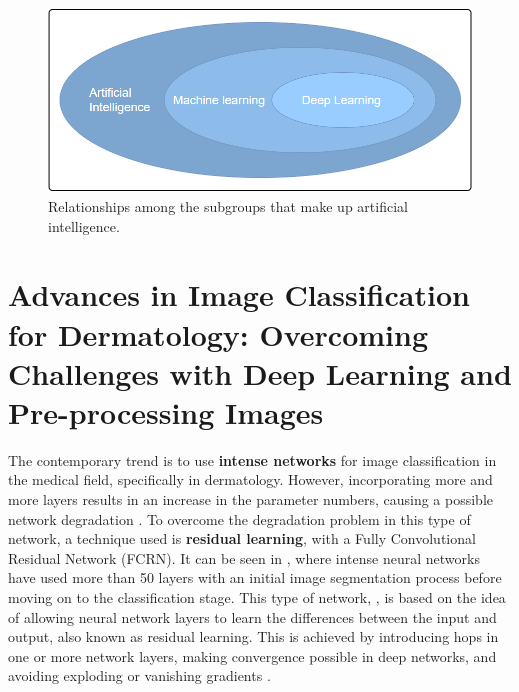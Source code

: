 \begin{figure}[ht]
    \begin{center}
        \includegraphics[scale=0.60]{images/State_of_the_art/AI_Group.png}
        \caption{Relationships among the subgroups that make up artificial intelligence.}
    \label{fig:IA Subgroup}    
    \end{center}
\end{figure}


\section{Advances in Image Classification for Dermatology: Overcoming Challenges with Deep Learning
and  Pre-processing Images}

The contemporary trend is to use  \textbf{intense networks} for image classification in the medical field, specifically in dermatology. However, incorporating more and more layers results in an increase in the parameter numbers, causing a possible network degradation \cite{roy_effects_2023}. To overcome the degradation problem in this type of network, a technique used is \textbf{residual learning}, with a Fully Convolutional 
Residual Network (FCRN). It can be seen in  \cite{7792699}, where intense neural networks have used more than 50 layers with an initial image segmentation process before moving on to the classification stage.  This type of network, \cite{laina_deeper_2016}, is based on the idea of allowing neural network layers to learn the differences between the input and output, also known as residual learning. This is achieved by introducing hops in one or more network layers, making convergence possible in deep networks, and avoiding exploding or vanishing gradients \cite{wong_what_2021}.

